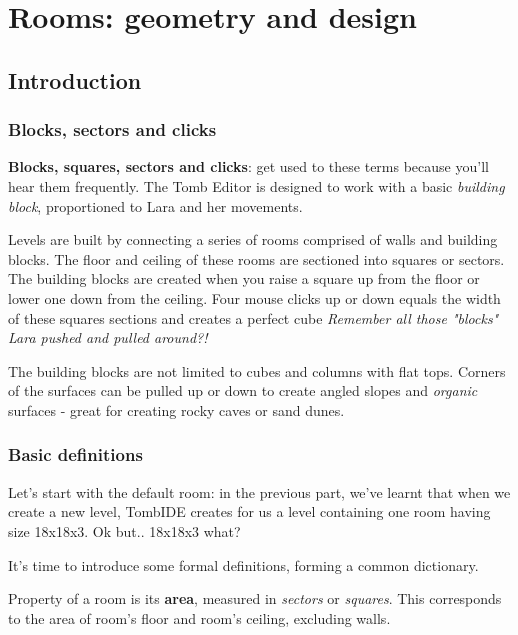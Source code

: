 \part{Rooms: geometry and design}

\chapter{Introduction}

\section{Blocks, sectors and clicks}

\textbf{Blocks, squares, sectors and clicks}: get used to these terms because you'll hear them frequently. The Tomb Editor is designed to work with a basic \emph{building block}, proportioned to Lara and her movements.
\par Levels are built by connecting a series of rooms comprised of walls and building blocks. The floor and ceiling of these rooms are sectioned into squares or sectors. The building blocks are created when you raise a square up from the floor or lower one down from the ceiling. Four mouse clicks up or down equals the width of these squares sections and creates a perfect cube \emph{Remember all those "blocks" Lara pushed and pulled around?!}
\par The building blocks are not limited to cubes and columns with flat tops. Corners of the surfaces can be pulled up or down to create angled slopes and \emph{organic} surfaces - great for creating rocky caves or sand dunes. \cite{trle_manual}

\section{Basic definitions}

Let's start with the default room: in the previous part, we've learnt that when we create a new level, TombIDE creates for us a level containing one room having size 18x18x3. Ok but.. 18x18x3 what?

It's time to introduce some formal definitions, forming a common dictionary.

\begin{remark}
    Property of a room is its \textbf{area}, measured in \emph{sectors} or \emph{squares}. This corresponds to the area of room's floor and room's ceiling, excluding walls.
\end{remark}

